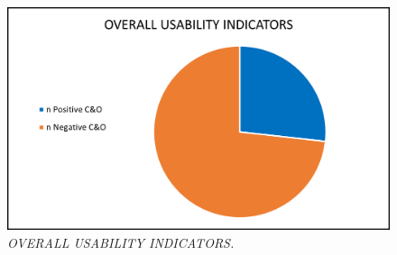 \begin{figure}[h]
	\includegraphics[width=\textwidth]{UT_Visual_illustration_7.png}
	\caption{\textit{OVERALL USABILITY INDICATORS.}}
	\label{fig:label7}
\end{figure}